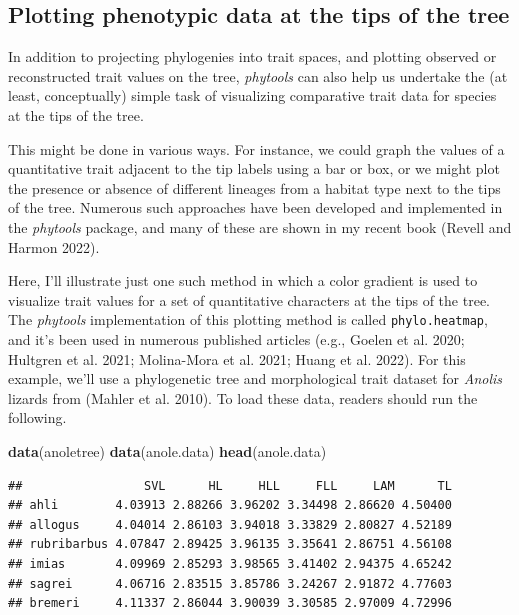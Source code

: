 \documentclass[fleqn,10pt,lineno]{wlpeerj} %
\newenvironment{Shaded}{\begin{snugshade}}{\end{snugshade}}
\newcommand{\FunctionTok}[1]{\textcolor[rgb]{0.13,0.29,0.53}{\textbf{#1}}}
\newcommand{\NormalTok}[1]{#1}
\begin{document}
\hypertarget{plotting-phenotypic-data-at-the-tips-of-the-tree}{%
\subsection{Plotting phenotypic data at the tips of the tree}\label{plotting-phenotypic-data-at-the-tips-of-the-tree}}

In addition to projecting phylogenies into trait spaces, and plotting observed or reconstructed trait values on the tree, \emph{phytools} can also help us undertake the (at least, conceptually) simple task of visualizing comparative trait data for species at the tips of the tree.

This might be done in various ways. For instance, we could graph the values of a quantitative trait adjacent to the tip labels using a bar or box, or we might plot the presence or absence of different lineages from a habitat type next to the tips of the tree. Numerous such approaches have been developed and implemented in the \emph{phytools} package, and many of these are shown in my recent book (Revell and Harmon 2022).

Here, I'll illustrate just one such method in which a color gradient is used to visualize trait values for a set of quantitative characters at the tips of the tree. The \emph{phytools} implementation of this plotting method is called \texttt{phylo.heatmap}, and it's been used in numerous published articles (e.g., Goelen et al. 2020; Hultgren et al. 2021; Molina-Mora et al. 2021; Huang et al. 2022). For this example, we'll use a phylogenetic tree and morphological trait dataset for \emph{Anolis} lizards from (Mahler et al. 2010). To load these data, readers should run the following.

\begin{Shaded}
\begin{Highlighting}[]
\FunctionTok{data}\NormalTok{(anoletree)}
\FunctionTok{data}\NormalTok{(anole.data)}
\FunctionTok{head}\NormalTok{(anole.data)}
\end{Highlighting}
\end{Shaded}

\begin{verbatim}
##                 SVL      HL     HLL     FLL     LAM      TL
## ahli        4.03913 2.88266 3.96202 3.34498 2.86620 4.50400
## allogus     4.04014 2.86103 3.94018 3.33829 2.80827 4.52189
## rubribarbus 4.07847 2.89425 3.96135 3.35641 2.86751 4.56108
## imias       4.09969 2.85293 3.98565 3.41402 2.94375 4.65242
## sagrei      4.06716 2.83515 3.85786 3.24267 2.91872 4.77603
## bremeri     4.11337 2.86044 3.90039 3.30585 2.97009 4.72996
\end{verbatim}
\end{document}
